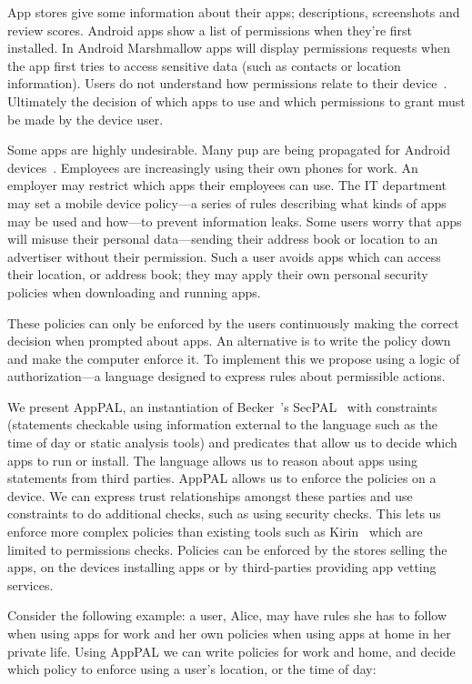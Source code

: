 \documentclass[]{llncs}
\begin{document}
App stores give some information about their apps; descriptions, screenshots and review scores.
Android apps show a list of permissions when they're first installed.
In Android Marshmallow apps will display permissions requests when the app first tries to access sensitive data (such as contacts or location information).
Users do not understand how permissions relate to their device~\cite{Felt:2012hm,Thompson:2013eb}.
Ultimately the decision of which apps to use and which permissions to grant must be made by the device user.

Some apps are highly undesirable.
Many \ac{pup} are being propagated for Android devices~\cite{Truong:2014bi,Svajcer:2013tp}.
Employees are increasingly using their own phones for work.
An employer may restrict which apps their employees can use.
The IT department may set a mobile device policy---a series of rules describing what kinds of apps may be used and how---to prevent information leaks.
Some users worry that apps will misuse their personal data---sending their address book or location to an advertiser without their permission.
Such a user avoids apps which can access their location, or address book; they may apply their own personal security policies when downloading and running apps.

These policies can only be enforced by the users continuously making the correct decision when prompted about apps.
An alternative is to write the policy down and make the computer enforce it.
To implement this we propose using a logic of authorization---a language designed to express rules about permissible actions.

We present AppPAL, an instantiation of Becker~\etal's
SecPAL~\cite{Becker:2006vh} with constraints (statements checkable using information external to the language such as the time of day or static analysis tools) and predicates that allow us to decide which apps to run or install.
The language allows us to reason about apps using statements from third parties.
AppPAL allows us to enforce the policies on a device.
We can express trust relationships amongst these parties and use constraints to do additional checks, such as using security checks.
This lets us enforce more complex policies than existing tools such as Kirin~\cite{Enck:2009ko} which are limited to permissions checks.
Policies can be enforced by the stores selling the apps, on the devices installing apps or by third-parties providing app vetting services.

Consider the following example:
  a user, Alice, may have rules she has to follow when using apps for work and her own policies when using apps at home in her private life.
Using AppPAL we can write policies for work and home, and decide which policy to enforce using a user's location, or the time of day:
\end{document}
